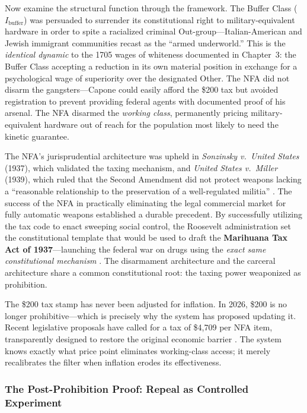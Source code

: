 \documentclass[12pt,openany]{book}
\begin{document}
Now examine the structural function through the framework. The Buffer Class ($I_{\text{buffer}}$) was persuaded to surrender its constitutional right to military-equivalent hardware in order to spite a racialized criminal Out-group---Italian-American and Jewish immigrant communities recast as the ``armed underworld.'' This is the \textit{identical dynamic} to the 1705 wages of whiteness documented in Chapter~3: the Buffer Class accepting a reduction in its own material position in exchange for a psychological wage of superiority over the designated Other. The NFA did not disarm the gangsters---Capone could easily afford the \$200 tax but avoided registration to prevent providing federal agents with documented proof of his arsenal. The NFA disarmed the \textit{working class}, permanently pricing military-equivalent hardware out of reach for the population most likely to need the kinetic guarantee.

The NFA's jurisprudential architecture was upheld in \textit{Sonzinsky v.\ United States} (1937), which validated the taxing mechanism, and \textit{United States v.\ Miller} (1939), which ruled that the Second Amendment did not protect weapons lacking a ``reasonable relationship to the preservation of a well-regulated militia'' \cite{dickinson_nfa, ebsco_nfa}. The success of the NFA in practically eliminating the legal commercial market for fully automatic weapons established a durable precedent. By successfully utilizing the tax code to enact sweeping social control, the Roosevelt administration set the constitutional template that would be used to draft the \textbf{Marihuana Tax Act of 1937}---launching the federal war on drugs using the \textit{exact same constitutional mechanism} \cite{cato_prohibition}. The disarmament architecture and the carceral architecture share a common constitutional root: the taxing power weaponized as prohibition.

The \$200 tax stamp has never been adjusted for inflation. In 2026, \$200 is no longer prohibitive---which is precisely why the system has proposed updating it. Recent legislative proposals have called for a tax of \$4,709 per NFA item, transparently designed to restore the original economic barrier \cite{murphy2025nfa}. The system knows exactly what price point eliminates working-class access; it merely recalibrates the filter when inflation erodes its effectiveness.

\subsubsection{The Post-Prohibition Proof: Repeal as Controlled Experiment}
\end{document}
